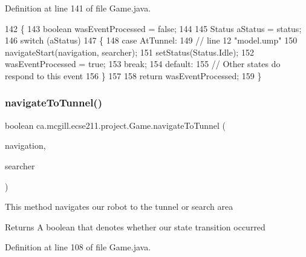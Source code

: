 Definition at line 141 of file Game.\+java.


\begin{DoxyCode}
142   \{
143     \textcolor{keywordtype}{boolean} wasEventProcessed = \textcolor{keyword}{false};
144     
145     Status aStatus = status;
146     \textcolor{keywordflow}{switch} (aStatus)
147     \{
148       \textcolor{keywordflow}{case} AtTunnel:
149         \textcolor{comment}{// line 12 "model.ump"}
150         navigateStart(navigation, searcher);
151         setStatus(Status.Idle);
152         wasEventProcessed = \textcolor{keyword}{true};
153         \textcolor{keywordflow}{break};
154       \textcolor{keywordflow}{default}:
155         \textcolor{comment}{// Other states do respond to this event}
156     \}
157 
158     \textcolor{keywordflow}{return} wasEventProcessed;
159   \}
\end{DoxyCode}
\mbox{\label{enumca_1_1mcgill_1_1ecse211_1_1project_1_1_game_ad3d03cffa33c927317d8fcba0c928a24}} 
\subsubsection{\texorpdfstring{navigate\+To\+Tunnel()}{navigateToTunnel()}}
{\footnotesize\ttfamily boolean ca.\+mcgill.\+ecse211.\+project.\+Game.\+navigate\+To\+Tunnel (\begin{DoxyParamCaption}\item[{\hyperlink{classca_1_1mcgill_1_1ecse211_1_1project_1_1_navigation}{Navigation}}]{navigation,  }\item[{\hyperlink{classca_1_1mcgill_1_1ecse211_1_1threads_1_1_ring_searcher}{Ring\+Searcher}}]{searcher }\end{DoxyParamCaption})}

This method navigates our robot to the tunnel or search area

\begin{DoxyReturn}{Returns}
A boolean that denotes whether our state transition occurred 
\end{DoxyReturn}


Definition at line 108 of file Game.\+java.


